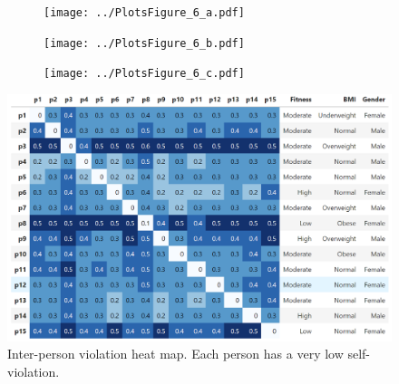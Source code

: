 \begin{figure}[t!]
	\centering
	\vspace{-3mm}
	\hspace{-3mm}
	\begin{subfigure}[t]{0.16\textwidth}
		\centering
		\texttt{[image: ../PlotsFigure\_6\_a.pdf]}
	\vspace{-5mm}
	\caption{\phantom{randomrand}}
	\label{fig:har-ml-experiment}
	\end{subfigure}	
	\begin{subfigure}[t]{0.16\textwidth}
		\centering
		\texttt{[image: ../PlotsFigure\_6\_b.pdf]}
	\vspace{-5mm}
	\caption{}
	\label{fig:har-ml-experiment-noise}
	\end{subfigure}	
	\begin{subfigure}[t]{0.16\textwidth}
		\centering
		\texttt{[image: ../PlotsFigure\_6\_c.pdf]}
	\vspace{-5mm}
	\caption{}
	\label{fig:gradual-drift-har}
	\end{subfigure}
	\vspace{-5mm}	
	\caption{(a)~As a higher fraction of mobile activity data is mixed with
sedentary activity data, \dis are violated more, and the classifier's
mean accuracy-drop increases. 
%
(b)~
%
(c)~\system detects the gradual local drift on the
HAR dataset as more people start changing their
activities. In contrast, weighted-PCA (W-PCA) fails to detect drift in absence of
a strong global drift.} 
		\vspace{2mm}	
	\centering
	\includegraphics[width=1\linewidth]{Figures/Figure_7.png}
		\vspace{-7mm}	
	\caption{ Inter-person \invariant violation heat map. Each person has a very low self-violation.}
	\label{fig:har-inter-person-drift-heatmap}
		\vspace{1mm}	
	\centering
\end{figure}


